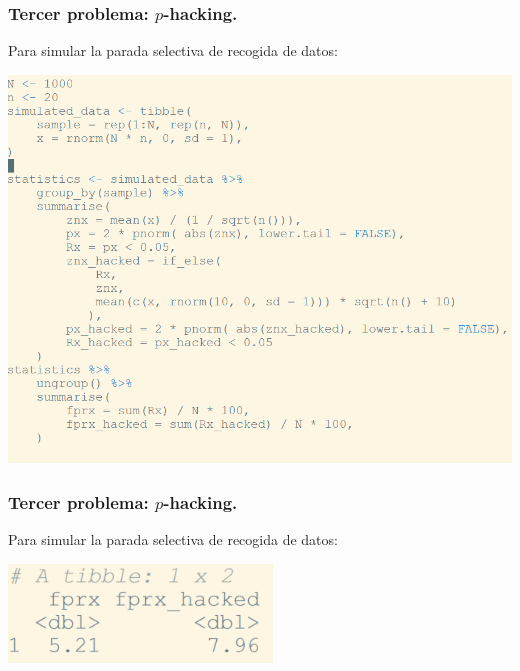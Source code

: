 \documentclass[9pt]{beamer}
\begin{document}
\begin{frame}
  \frametitle{Tercer problema: $p$-hacking.}
  \begin{overlayarea}{\textwidth}{\textheight}
  Para simular la parada selectiva de recogida de datos:
  \begin{center}
    \includegraphics[height=0.9\textheight]{images/R-script-2}
  \end{center}
\end{overlayarea}
\end{frame}


\begin{frame}
  \frametitle{Tercer problema: $p$-hacking.}
    \begin{overlayarea}{\textwidth}{\textheight}
  Para simular la parada selectiva de recogida de datos: \\
\begin{center}
\includegraphics[width=7cm]{images/resultados_select_size}  
\end{center}

\end{overlayarea}
\end{frame}
\end{document}
